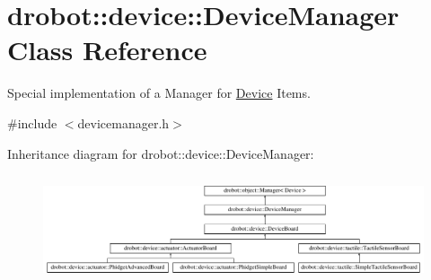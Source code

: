 \hypertarget{classdrobot_1_1device_1_1DeviceManager}{\section{drobot\-:\-:device\-:\-:Device\-Manager Class Reference}
\label{classdrobot_1_1device_1_1DeviceManager}
}


Special implementation of a Manager for \hyperlink{classdrobot_1_1device_1_1Device}{Device} Items.  




{\ttfamily \#include $<$devicemanager.\-h$>$}

Inheritance diagram for drobot\-:\-:device\-:\-:Device\-Manager\-:\begin{figure}[H]
\begin{center}
\leavevmode
\includegraphics[height=3.185438cm]{classdrobot_1_1device_1_1DeviceManager}
\end{center}
\end{figure}
